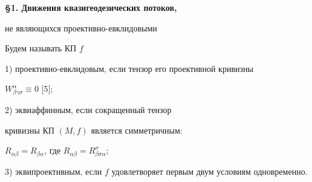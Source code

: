 \begin{center}


{\bf \S 1. Движения квазигеодезических потоков,


не являющихся проективно-евклидовыми}


\end{center}


\medskip





\begin{defn}


Будем называть КП $f$





1) проективно-евклидовым, если тензор его проективной кривизны


$W^{\alpha}_{\beta \gamma \sigma}\equiv 0$ [5];





2) эквиаффинным, если сокращенный тензор 


кривизны КП $(M,f) $ является симметричным:


$R_{\alpha \beta}=R_{\beta \alpha}$, где $R_{\alpha \beta}


=R^{\sigma}_{\beta \sigma \alpha}$;





3) эквипроективным, если $f$ удовлетворяет первым двум условиям одновременно.


\end{defn}





